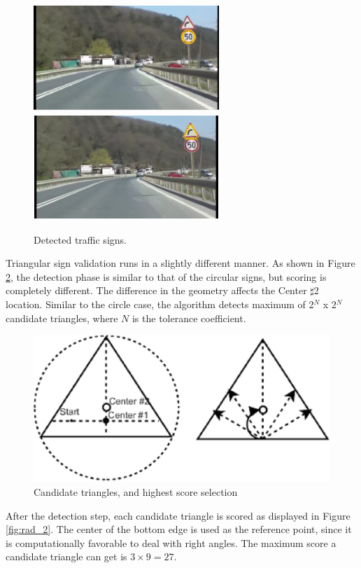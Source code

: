 \documentclass[twocolumn,letterpaper,10pt]{article}
\begin{document}
\begin{figure}[ht]
\begin{center}
\includegraphics[width=70mm,height=40mm]{img/sdfig5.eps}
\includegraphics[width=70mm,height=40mm]{img/sdtri2.eps}
\caption{Detected traffic signs.}
\label{fig:sdfig5}
\end{center}
\end{figure}
\par
Triangular sign validation runs in a slightly different manner. As shown in Figure \ref{fig:rad_3}, the detection phase is similar to that of the circular signs, but scoring is completely different. The difference in the geometry affects the Center $\sharp$2 location. Similar to the circle case, the algorithm detects maximum of 2$^\textit{N}$ x 2$^\textit{N}$ candidate triangles, where $\textit{N}$ is the tolerance coefficient. 
\begin{figure}[ht]
\begin{center}
\includegraphics[scale=0.5]{img/fig_radial3.eps}
\caption{Candidate triangles, and highest score selection}
\label{fig:rad_3}
\end{center}
\end{figure}
\par
After the detection step, each candidate triangle is scored as displayed in Figure \ref{fig:rad_2}. The center of the bottom edge is used as the reference point, since it is computationally favorable to deal with right angles. The maximum score a candidate triangle can get is $3 \times 9 = 27$. 
\end{document}

